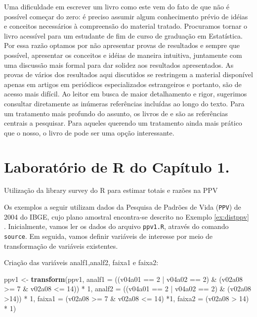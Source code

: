 \documentclass[]{book}
\newenvironment{Shaded}{\begin{snugshade}}{\end{snugshade}}
\newcommand{\KeywordTok}[1]{\textcolor[rgb]{0.13,0.29,0.53}{\textbf{{#1}}}}
\newcommand{\DataTypeTok}[1]{\textcolor[rgb]{0.13,0.29,0.53}{{#1}}}
\newcommand{\DecValTok}[1]{\textcolor[rgb]{0.00,0.00,0.81}{{#1}}}
\newcommand{\StringTok}[1]{\textcolor[rgb]{0.31,0.60,0.02}{{#1}}}
\newcommand{\NormalTok}[1]{{#1}}
\numberwithin{example}{chapter}
\numberwithin{remark}{chapter}
\numberwithin{definition}{chapter}
\let\BeginKnitrBlock\begin \let\EndKnitrBlock\end
\begin{document}
Uma dificuldade em escrever um livro como este vem do fato de que não é
possível começar do zero: é preciso assumir algum conhecimento prévio de
idéias e conceitos necessários à compreensão do material tratado.
Procuramos tornar o livro acessível para um estudante de fim de curso de
graduação em Estatística. Por essa razão optamos por não apresentar
provas de resultados e sempre que possível, apresentar os conceitos e
idéias de maneira intuitiva, juntamente com uma discussão mais formal
para dar solidez aos resultados apresentados. As provas de vários dos
resultados aqui discutidos se restringem a material disponível apenas em
artigos em periódicos especializados estrangeiros e portanto, são de
acesso mais difícil. Ao leitor em busca de maior detalhamento e rigor,
sugerimos consultar diretamente as inúmeras referências incluídas ao
longo do texto. Para um tratamento mais profundo do assunto, os livros
de \citep{SHS89} e \citep{CHSK2003} são as referências centrais a
pesquisar. Para aqueles querendo um tratamento ainda mais prático que o
nosso, o livro de \citep{lethonen} pode ser uma opção interessante.

\section{Laboratório de R do Capítulo 1.}\label{epa}

\BeginKnitrBlock{example}
\protect\hypertarget{ex:unnamed-chunk-2}{}{\label{ex:unnamed-chunk-2}}Utilização
da library survey do R para estimar totais e razões na PPV
\EndKnitrBlock{example} Os exemplos a seguir utilizam dados da Pesquisa
de Padrões de Vida (\texttt{PPV}) de 2004 do IBGE, cujo plano amostral
encontra-se descrito no Exemplo \ref{ex:distppv} . Inicialmente, vamos
ler os dados do arquivo \texttt{ppv1.R}, através do comando
\texttt{source}. Em seguida, vamos definir variáveis de interesse por
meio de transformação de variáveis existentes.

Criação das variáveis analf1,analf2, faixa1 e faixa2:

\begin{Shaded}
\begin{Highlighting}[]
\NormalTok{ppv1 <-}\StringTok{ }\KeywordTok{transform}\NormalTok{(ppv1, }\DataTypeTok{analf1 =} \NormalTok{((v04a01 ==}\StringTok{ }\DecValTok{2} \NormalTok{|}\StringTok{    }\NormalTok{v04a02 ==}\StringTok{ }\DecValTok{2}\NormalTok{) &}\StringTok{ }\NormalTok{(v02a08 >=}\StringTok{ }\DecValTok{7} \NormalTok{&}\StringTok{ }
\NormalTok{v02a08 <=}\StringTok{ }\DecValTok{14}\NormalTok{)) *}\StringTok{   }\DecValTok{1}\NormalTok{, }\DataTypeTok{analf2 =} \NormalTok{((v04a01 ==}\StringTok{ }\DecValTok{2} \NormalTok{|}\StringTok{ }\NormalTok{v04a02 ==}\StringTok{ }\DecValTok{2}\NormalTok{) &}\StringTok{ }
\NormalTok{(v02a08 >}\DecValTok{14}\NormalTok{)) *}\StringTok{ }\DecValTok{1}\NormalTok{, }\DataTypeTok{faixa1 =} \NormalTok{(v02a08 >=}\StringTok{ }\DecValTok{7} \NormalTok{&}\StringTok{ }\NormalTok{v02a08 <=}\StringTok{ }\DecValTok{14}\NormalTok{) *}\DecValTok{1}\NormalTok{, }\DataTypeTok{faixa2 =} \NormalTok{(v02a08 >}\StringTok{ }\DecValTok{14}\NormalTok{) *}\StringTok{ }\DecValTok{1}\NormalTok{)}
\end{Highlighting}
\end{Shaded}
\end{document}
